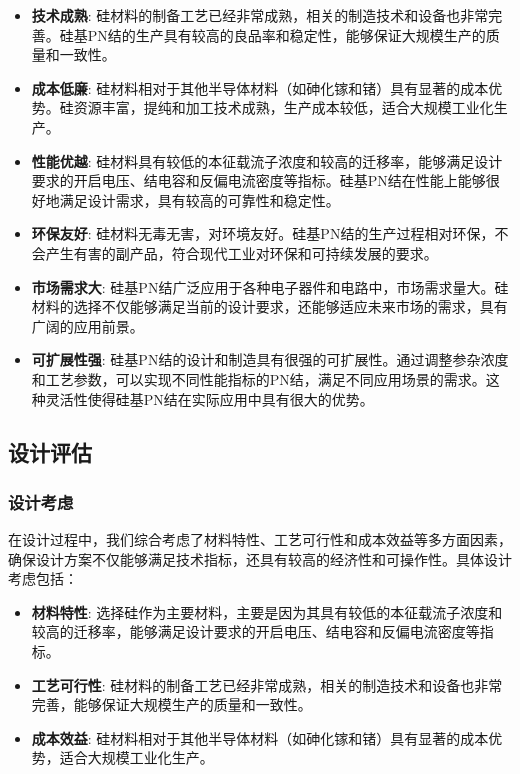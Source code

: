 \documentclass[12pt,hyperref,a4paper,UTF8]{ctexart}
\begin{document}
\begin{itemize}
    \item \textbf{技术成熟}: 硅材料的制备工艺已经非常成熟，相关的制造技术和设备也非常完善。硅基PN结的生产具有较高的良品率和稳定性，能够保证大规模生产的质量和一致性。

    \item \textbf{成本低廉}: 硅材料相对于其他半导体材料（如砷化镓和锗）具有显著的成本优势。硅资源丰富，提纯和加工技术成熟，生产成本较低，适合大规模工业化生产。

    \item \textbf{性能优越}: 硅材料具有较低的本征载流子浓度和较高的迁移率，能够满足设计要求的开启电压、结电容和反偏电流密度等指标。硅基PN结在性能上能够很好地满足设计需求，具有较高的可靠性和稳定性。

    \item \textbf{环保友好}: 硅材料无毒无害，对环境友好。硅基PN结的生产过程相对环保，不会产生有害的副产品，符合现代工业对环保和可持续发展的要求。

    \item \textbf{市场需求大}: 硅基PN结广泛应用于各种电子器件和电路中，市场需求量大。硅材料的选择不仅能够满足当前的设计要求，还能够适应未来市场的需求，具有广阔的应用前景。

    \item \textbf{可扩展性强}: 硅基PN结的设计和制造具有很强的可扩展性。通过调整参杂浓度和工艺参数，可以实现不同性能指标的PN结，满足不同应用场景的需求。这种灵活性使得硅基PN结在实际应用中具有很大的优势。

\end{itemize}
\subsection{设计评估}
\subsubsection*{设计考虑}
在设计过程中，我们综合考虑了材料特性、工艺可行性和成本效益等多方面因素，确保设计方案不仅能够满足技术指标，还具有较高的经济性和可操作性。具体设计考虑包括：

\begin{itemize}
    \item \textbf{材料特性}: 选择硅作为主要材料，主要是因为其具有较低的本征载流子浓度和较高的迁移率，能够满足设计要求的开启电压、结电容和反偏电流密度等指标。
    \item \textbf{工艺可行性}: 硅材料的制备工艺已经非常成熟，相关的制造技术和设备也非常完善，能够保证大规模生产的质量和一致性。
    \item \textbf{成本效益}: 硅材料相对于其他半导体材料（如砷化镓和锗）具有显著的成本优势，适合大规模工业化生产。
\end{itemize}
\end{document}
